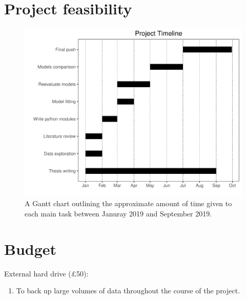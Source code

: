 \documentclass[
11pt, %
onehalfspacing, %
parskip, %
headsepline, %
]{article} %
\begin{document}
\begin{linenumbers}
\section*{Project feasibility}
\begin{figure}[H]
      \includegraphics[width = 1\textwidth]{../Data/gantt_new.PDF}
      \caption{A Gantt chart outlining the approximate amount of time given to each main task between Januray 2019 and September 2019.}
\end{figure}


\maketitle
\section*{Budget}
	\item External hard drive (£50):
	\begin{enumerate}
		\item To back up large volumes of data throughout the course of the project.
\end{enumerate}

\end{linenumbers}
\end{document}
